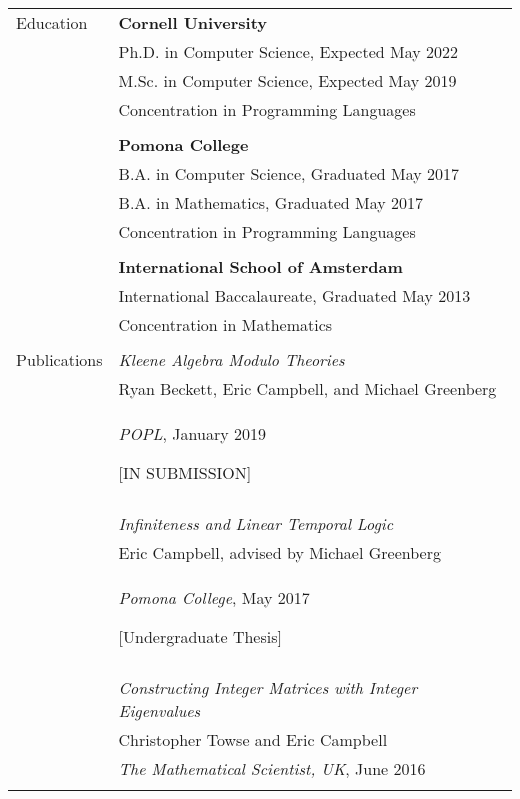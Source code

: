 \documentclass[letterpaper,11pt,oneside]{article}
\begin{document}
\noindent \begin{tabular}{@{} l l}
  \Large{Education} 
    & \textbf{Cornell University} \\
  
    & Ph.D. in Computer Science, Expected May 2022 \\

  
    & M.Sc. in Computer Science, Expected May 2019 \\
  

    & Concentration in Programming Languages \\
    & \\


    & \textbf{Pomona College} \\

    & B.A. in Computer Science, Graduated May 2017 \\

  
    & B.A. in Mathematics, Graduated May 2017 \\
  

    & Concentration in Programming Languages \\
    & \\


    & \textbf{International School of Amsterdam} \\

    & International Baccalaureate, Graduated May 2013 \\

    & Concentration in Mathematics \\
    & \\
  \Large{Publications} 
    & \textit{Kleene Algebra Modulo Theories} \\
    & Ryan Beckett, Eric Campbell, and Michael Greenberg \\
    & \textit{POPL}, January 2019

    \hfill [IN SUBMISSION]
 \\
    & \\

    & \textit{Infiniteness and Linear Temporal Logic} \\
    & Eric Campbell, advised by Michael Greenberg \\
    & \textit{Pomona College}, May 2017

    \hfill [Undergraduate Thesis]
 \\
    & \\

    & \textit{Constructing Integer Matrices with Integer Eigenvalues} \\
    & Christopher Towse and Eric Campbell \\
    & \textit{The Mathematical Scientist, UK}, June 2016
 \\
    & \\
\end{tabular}
\end{document}
